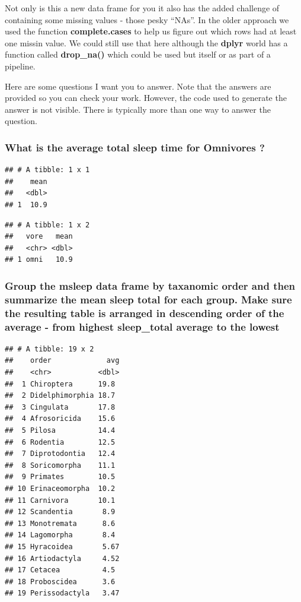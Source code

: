 \documentclass[]{book}
\begin{document}
Not only is this a new data frame for you it also has the added challenge of containing some missing values - those pesky ``NAs''. In the older approach we used the function \textbf{complete.cases} to help us figure out which rows had at least one missin value. We could still use that here although the \textbf{dplyr} world has a function called \textbf{drop\_na()} which could be used but itself or as part of a pipeline.

Here are some questions I want you to answer. Note that the answers are provided so you can check your work. However, the code used to generate the answer is not visible. There is typically more than one way to answer the question.

\hypertarget{what-is-the-average-total-sleep-time-for-omnivores}{%
\subsubsection{What is the average total sleep time for Omnivores ?}\label{what-is-the-average-total-sleep-time-for-omnivores}}

\begin{verbatim}
## # A tibble: 1 x 1
##    mean
##   <dbl>
## 1  10.9
\end{verbatim}

\begin{verbatim}
## # A tibble: 1 x 2
##   vore   mean
##   <chr> <dbl>
## 1 omni   10.9
\end{verbatim}

\hypertarget{group-the-msleep-data-frame-by-taxanomic-order-and-then-summarize-the-mean-sleep-total-for-each-group.-make-sure-the-resulting-table-is-arranged-in-descending-order-of-the-average---from-highest-sleep_total-average-to-the-lowest}{%
\subsubsection{Group the msleep data frame by taxanomic order and then summarize the mean sleep total for each group. Make sure the resulting table is arranged in descending order of the average - from highest sleep\_total average to the lowest}\label{group-the-msleep-data-frame-by-taxanomic-order-and-then-summarize-the-mean-sleep-total-for-each-group.-make-sure-the-resulting-table-is-arranged-in-descending-order-of-the-average---from-highest-sleep_total-average-to-the-lowest}}

\begin{verbatim}
## # A tibble: 19 x 2
##    order             avg
##    <chr>           <dbl>
##  1 Chiroptera      19.8 
##  2 Didelphimorphia 18.7 
##  3 Cingulata       17.8 
##  4 Afrosoricida    15.6 
##  5 Pilosa          14.4 
##  6 Rodentia        12.5 
##  7 Diprotodontia   12.4 
##  8 Soricomorpha    11.1 
##  9 Primates        10.5 
## 10 Erinaceomorpha  10.2 
## 11 Carnivora       10.1 
## 12 Scandentia       8.9 
## 13 Monotremata      8.6 
## 14 Lagomorpha       8.4 
## 15 Hyracoidea       5.67
## 16 Artiodactyla     4.52
## 17 Cetacea          4.5 
## 18 Proboscidea      3.6 
## 19 Perissodactyla   3.47
\end{verbatim}
\end{document}
